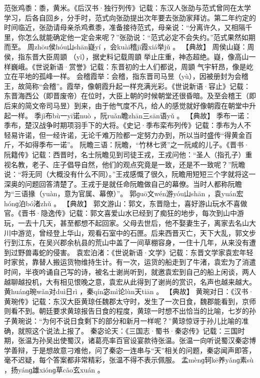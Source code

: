 \documentclass[12pt,UTF8]{ctexbook}
\begin{document}
范张鸡黍：黍，黄米。《后汉书·独行列传》记载：东汉人张劭与范式曾同在太学学习，后各自回乡，分手时，范式向张劭提出次年要去张劭家拜访。第二年约定的时间临近，张劭请母亲杀鸡煮黍，准备接待范式，母亲说：“分离许久，又相隔千里，你怎么就能确定他一定会来呢？”张劭说：“范式必定不会失约。”范式果然如期而至。
周zhōu侯hóu山shān嶷yí
，会kuài稽jī霞xiá举jǔ
。
【典故】
周侯山嶷：周侯，指东晋大臣周顗
（yǐ），据史料记载周顗
举止庄重，神态超绝。嶷，像高山一样巍峨。《世说新语·赏誉》记载：东晋初的士人们都说，周顗
气宇轩昂，像是屹立在平地的孤峰一样。
会稽霞举：会稽，指东晋司马昱（yù），因被册封为会稽王，故简称“会稽”。霞举，像朝霞升起一样充满光彩。《世说新语·容止》记载：东晋海西公（即晋废帝）在位时，大臣上朝的时候朝堂还很昏暗。及至会稽王（即后来的简文帝司马昱）到来，由于他气度不凡，给人的感觉就好像朝霞在朝堂中升起一样。
季jì布bù一yī诺nuò
，阮ruǎn瞻zhān三sān语yǔ
。
【典故】
季布一诺：季布，楚汉战争时期项羽手下的大将。《史记·季布栾布列传》记载：季布为人不轻易许诺，但一经许诺，无论千难万险都一定努力办到，所以当时盛传“得黄金百斤，不如得季布一诺”。
阮瞻三语：阮瞻，“竹林七贤”之一阮咸的儿子。《晋书·阮籍传》记载：西晋时，名士阮瞻见到司徒王戎，王戎问他：“圣人（指孔子）重视名教，老子、庄子倡导自然，他们的观点究竟是一致，还是不一致呢？”阮瞻说：“将无同（大概没有什么不同）。”王戎感慨了很久，阮瞻用短短三个字就将这一深奥的问题回答清楚了。王戎于是就任命阮瞻做自己的幕僚。当时人都称阮瞻为“三语掾（yuàn，意为官属、幕僚）”。
郭ɡuō文wén游yóu山shān
，袁yuán宏hónɡ泊bó渚zhǔ
。
【典故】
郭文游山：郭文，东晋隐士，喜好游山玩水不喜做官。《晋书·隐逸传》记载：郭文喜爱山水已经到了痴狂的地步，每次到山中游玩，一去十几天，甚至都想不起回家。父母去世后，他不娶妻生子，离家去名山大川中游览，曾经登上华山，观看石室中的石匣。后来西晋灭亡，天下大乱，郭文步行到江东，在吴兴郡余杭县的荒山中盖了一间草棚容身，一住十几年，从来没有遭到过野兽毒蛇的侵害。
袁宏泊渚：《世说新语·文学》记载：东晋文学家袁宏年轻时家贫，靠替人搬运货物维持生计。有一次，运货的船走到了牛渚，袁宏为了消遣时间，半夜吟诵自己写的诗，被名士谢尚听到，就邀袁宏到自己的船上闲谈，两人越聊越投机，大有相见恨晚之意，袁宏从此得到了谢尚的赏识，名声也越来越大。
黄huánɡ琬wǎn对duì日rì
，秦qín宓mì论lùn天tiān
。
【典故】
黄琬对日：《汉书·黄琬传》记载：东汉大臣黄琼任魏郡太守时，发生了一次日食，魏郡能看到，京师则看不到。朝廷要求黄琼报告日食的程度，黄琼一时想不出恰当的比喻，七岁的孙子黄琬说：“为何不说日食剩下的部分和新月一样呢？”黄琼惊讶于孙儿比喻的准确，就照这个说法上报了。
秦宓论天：《三国志·蜀书·秦宓传》记载：三国时期，张温为孙吴出使蜀汉，诸葛亮率百官设宴款待张温。张温一向听说蜀汉秦宓博学善辩，于是想故意刁难他，问了秦宓一连串与“天”相关的问题，秦宓闻声即答，毫不迟疑，每个答案都非常精彩，张温不得不表示佩服。
孟mènɡ轲kē养yǎnɡ素sù
，扬yánɡ雄xiónɡ草cǎo玄xuán
。
\end{document}
